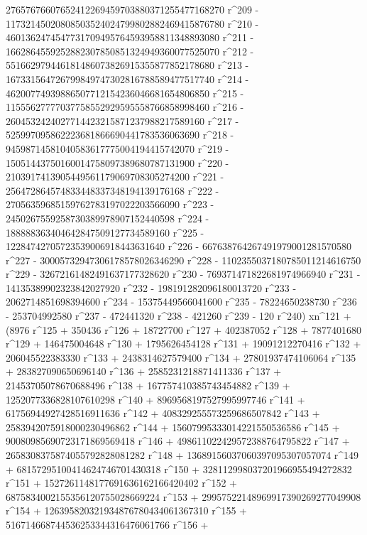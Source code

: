        27657676607652412269459703880371255477168270 r^209 - 
       11732145020808503524024799802882469415876780 r^210 - 
       4601362474547731709495764593958811348893080 r^211 - 
       1662864559252882307850851324949360077525070 r^212 - 
       551662979446181486073826915355877852178680 r^213 - 
       167331564726799849747302816788589477517740 r^214 - 
       46200774939886507712154236046681654806850 r^215 - 
       11555627777037758552929595558766858998460 r^216 - 
       2604532424027714423215871237988217589160 r^217 - 
       525997095862223681866690441783536063690 r^218 - 
       94598714581040583617775004194415742070 r^219 - 
       15051443750160014758097389680787131900 r^220 - 
       2103917413905449561179069708305274200 r^221 - 
       256472864574833448337348194139176168 r^222 - 
       27056359685159762783197022203566090 r^223 - 
       2450267559258730389978907152440598 r^224 - 
       188888363404642847509127734589160 r^225 - 
       12284742705723539006918443631640 r^226 - 
       667638764267491979001281570580 r^227 - 
       30005732947306178578026346290 r^228 - 
       1102355037180785011214616750 r^229 - 
       32672161482491637177328620 r^230 - 
       769371471822681974966940 r^231 - 
       14135389902323842027920 r^232 - 198191282096180013720 r^233 - 
       2062714851698394600 r^234 - 15375449566041600 r^235 - 
       78224650238730 r^236 - 253704992580 r^237 - 472441320 r^238 - 
       421260 r^239 - 120 r^240) xn^121 + (8976 r^125 + 
       350436 r^126 + 18727700 r^127 + 402387052 r^128 + 
       7877401680 r^129 + 146475004648 r^130 + 1795626454128 r^131 + 
       19091212270416 r^132 + 206045522383330 r^133 + 
       2438314627579400 r^134 + 27801937474106064 r^135 + 
       283827090650696140 r^136 + 2585231218871411336 r^137 + 
       21453705078670688496 r^138 + 167757410385743454882 r^139 + 
       1252077336828107610298 r^140 + 8969568197527995997746 r^141 + 
       61756944927428516911636 r^142 + 
       408329255573259686507842 r^143 + 
       2583942075918000230496862 r^144 + 
       15607995333014221550536586 r^145 + 
       90080985690723171869569418 r^146 + 
       498611022429572388764795822 r^147 + 
       2658308375874055792828081282 r^148 + 
       13689156037060397095307057074 r^149 + 
       68157295100414624746701430318 r^150 + 
       328112998037201966955494272832 r^151 + 
       1527261148177691636162166420402 r^152 + 
       6875834002155356120755028669224 r^153 + 
       29957522148969917390269277049908 r^154 + 
       126395820321934876780434061367310 r^155 + 
       516714668744536253344316476061766 r^156 + 
